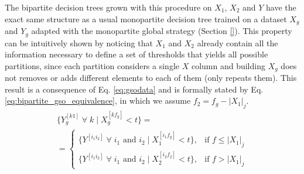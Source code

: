 \documentclass[conference]{IEEEtran}
\newcommand{\el}[1]{^{[#1]}}
\begin{document}
The bipartite decision trees grown with this procedure on $X_1$, $X_2$ and $Y$ have the exact same structure as a usual monopartite decision tree trained on a dataset $X_g$ and $Y_g$ adapted with the monopartite global strategy (Section \ref{}). This property can be intuitively shown by noticing that $X_1$ and $X_2$ already contain all the information necessary to define a set of thresholds that yields all possible partitions, since each partition considers a single $X$ column and building $X_g$ does not removes or adds different elements to each of them (only repeats them).
This result is a consequence of Eq. \ref{eq:gsodata} and is formally stated by Eq. \ref{eq:bipartite_gso_equivalence}, in which we assume $f_2 = f_g-|X_1|_j$.
%
\begin{multline}
    \{Y_g\el{k1}\;\forall\; k \mid X_g\el{kf_g} < t\} =\\
    =\begin{cases}
        \{Y\el{i_1i_2} \;\forall\; i_1\text{ and }i_2 \mid X_1\el{i_1f_g}<t\}, & \text{if } f \le |X_1|_j\\
        \{Y\el{i_1i_2} \;\forall\; i_1\text{ and }i_2 \mid X_2\el{i_2f_2}<t\}, & \text{if } f > |X_1|_j
    \end{cases}
    \label{eq:bipartite_gso_equivalence}
\end{multline}


\end{document}
